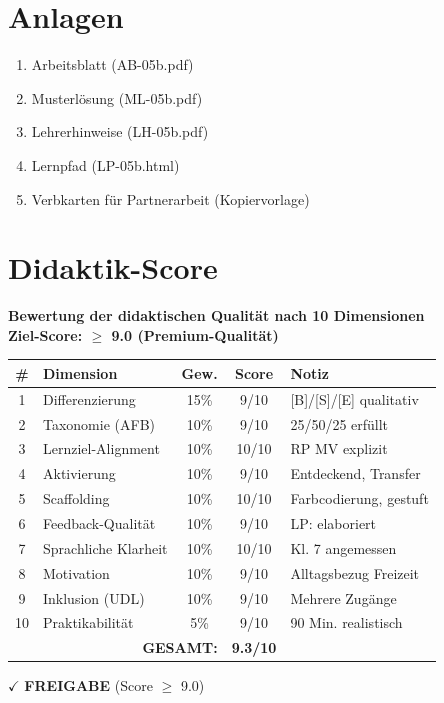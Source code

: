 \documentclass[11pt,a4paper]{article}
\begin{document}
\section{Anlagen}

\begin{enumerate}
    \item Arbeitsblatt (AB-05b.pdf)
    \item Musterlösung (ML-05b.pdf)
    \item Lehrerhinweise (LH-05b.pdf)
    \item Lernpfad (LP-05b.html)
    \item Verbkarten für Partnerarbeit (Kopiervorlage)
\end{enumerate}

\newpage
\section{Didaktik-Score}

\begin{scorebox}
\textbf{Bewertung der didaktischen Qualität nach 10 Dimensionen}\\
\textbf{Ziel-Score: $\geq$ 9.0 (Premium-Qualität)}

\vspace{1em}
\begin{tabular}{|c|l|c|c|p{4cm}|}
\hline
\textbf{\#} & \textbf{Dimension} & \textbf{Gew.} & \textbf{Score} & \textbf{Notiz} \\
\hline
1 & Differenzierung & 15\% & 9/10 & [B]/[S]/[E] qualitativ \\
\hline
2 & Taxonomie (AFB) & 10\% & 9/10 & 25/50/25 erfüllt \\
\hline
3 & Lernziel-Alignment & 10\% & 10/10 & RP MV explizit \\
\hline
4 & Aktivierung & 10\% & 9/10 & Entdeckend, Transfer \\
\hline
5 & Scaffolding & 10\% & 10/10 & Farbcodierung, gestuft \\
\hline
6 & Feedback-Qualität & 10\% & 9/10 & LP: elaboriert \\
\hline
7 & Sprachliche Klarheit & 10\% & 10/10 & Kl. 7 angemessen \\
\hline
8 & Motivation & 10\% & 9/10 & Alltagsbezug Freizeit \\
\hline
9 & Inklusion (UDL) & 10\% & 9/10 & Mehrere Zugänge \\
\hline
10 & Praktikabilität & 5\% & 9/10 & 90 Min. realistisch \\
\hline
\multicolumn{3}{|r|}{\textbf{GESAMT:}} & \textbf{9.3/10} & \\
\hline
\end{tabular}

\vspace{1em}
$\checkmark$ \textcolor{successgreen}{\textbf{FREIGABE} (Score $\geq$ 9.0)}
\end{scorebox}
\end{document}

